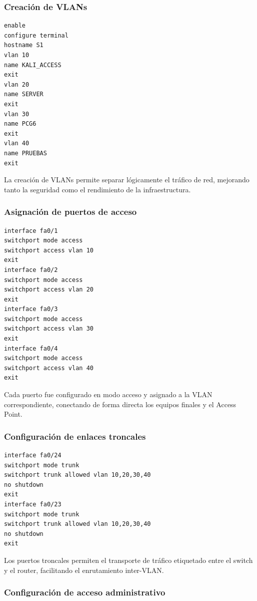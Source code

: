 \subsubsection{Creación de VLANs}

\begin{lstlisting}[caption={Creación y nombramiento de VLANs en el Switch}]
enable
configure terminal
hostname S1
vlan 10
name KALI_ACCESS
exit
vlan 20
name SERVER
exit
vlan 30
name PCG6
exit
vlan 40
name PRUEBAS
exit
\end{lstlisting}

La creación de VLANs permite separar lógicamente el tráfico de red, mejorando tanto la seguridad como el rendimiento de la infraestructura.

\subsubsection{Asignación de puertos de acceso}

\begin{lstlisting}[caption={Configuración de puertos de acceso en el Switch}]
interface fa0/1
switchport mode access
switchport access vlan 10
exit
interface fa0/2
switchport mode access
switchport access vlan 20
exit
interface fa0/3
switchport mode access
switchport access vlan 30
exit
interface fa0/4
switchport mode access
switchport access vlan 40
exit
\end{lstlisting}

Cada puerto fue configurado en modo acceso y asignado a la VLAN correspondiente, conectando de forma directa los equipos finales y el Access Point.

\subsubsection{Configuración de enlaces troncales}

\begin{lstlisting}[caption={Configuración de puertos troncales en el Switch}]
interface fa0/24
switchport mode trunk
switchport trunk allowed vlan 10,20,30,40
no shutdown
exit
interface fa0/23
switchport mode trunk
switchport trunk allowed vlan 10,20,30,40
no shutdown
exit
\end{lstlisting}

Los puertos troncales permiten el transporte de tráfico etiquetado entre el switch y el router, facilitando el enrutamiento inter-VLAN.

\subsubsection{Configuración de acceso administrativo}

